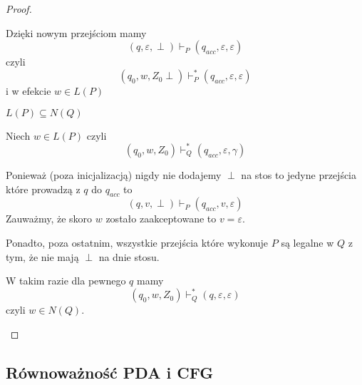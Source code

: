 \begin{proof}
\begin{description}
\begin{description}
			            Dzięki nowym przejściom mamy
			            \[
				            (q, \varepsilon, \perp) \vdash_P (q_{acc}, \varepsilon, \varepsilon)
			            \]
			            czyli
			            \[
				            (q_0, w, Z_0\perp) \vdash_P^* (q_{acc}, \varepsilon, \varepsilon)
			            \]
			            i w efekcie \( w \in L(P) \)


			      \item \( L(P) \subseteq N(Q) \)

			            Niech \( w \in L(P) \) czyli
			            \[
				            (q_0, w, Z_0) \vdash_Q^* (q_{acc}, \varepsilon, \gamma)
			            \]

			            Ponieważ (poza inicjalizacją) nigdy nie dodajemy \( \perp \) na stos to jedyne przejścia które prowadzą z \( q \) do \( q_{acc} \) to
			            \[
				            (q, v, \perp) \vdash_P (q_{acc}, v, \varepsilon)
			            \]
			            Zauważmy, że skoro \( w \) zostało zaakceptowane to \( v = \varepsilon \).

			            Ponadto, poza ostatnim, wszystkie przejścia które wykonuje \( P \) są legalne w \( Q \) z tym, że nie mają \( \perp \) na dnie stosu.

			            W takim razie dla pewnego \( q \) mamy
			            \[
				            (q_0, w, Z_0) \vdash_Q^* (q, \varepsilon, \varepsilon)
			            \]
			            czyli \( w \in N(Q) \).

		      \end{description}

	\end{description}
\end{proof}

\subsection{Równoważność PDA i CFG}


